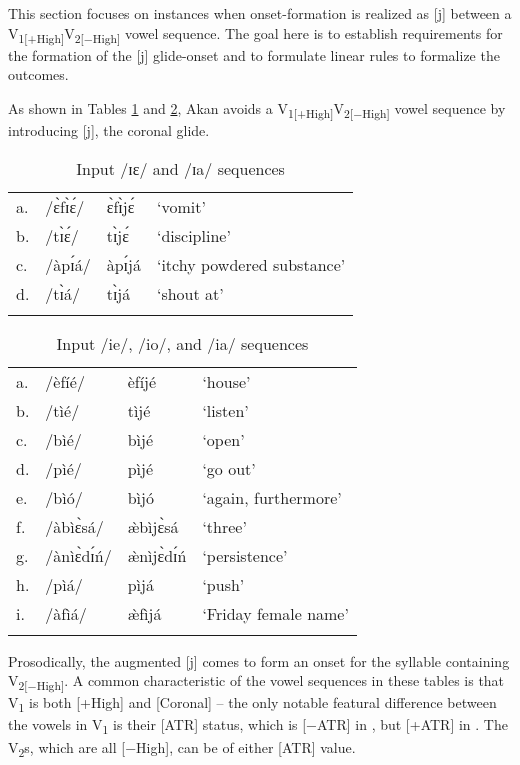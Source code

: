 \documentclass[output=paper,colorlinks,citecolor=brown]{langscibook}
\begin{document}
This section focuses on instances when onset-formation is realized as [j] between a V\textsubscript{1[+High]}V\textsubscript{2[−High]} vowel sequence. The goal here is to establish requirements for the formation of the [j] glide-onset and to formulate linear rules to formalize the outcomes.

As shown in Tables \ref{tab:Tableie_ia} and \ref{tab:Tableie_io}, Akan avoids a V\textsubscript{1[+High]}V\textsubscript{2[−High]} vowel sequence by introducing [j], the coronal glide. 

\begin{table}
\caption{Input /ɪɛ/ and /ɪa/ sequences}
\label{tab:Tableie_ia}
 \begin{tabular}{llll}
  \lsptoprule
a.	&/ɛ̀fɪ̀ɛ́/ 	&ɛ̀fɪ̀jɛ́	&‘vomit’\\
b.	&/tɪ̀ɛ́/	&tɪ̀jɛ́&	‘discipline’\\
c.	&/àpɪ́á/	&àpɪ́já	&‘itchy powdered substance’\\
d.&	/tɪ̀á/ &	tɪ̀já&	‘shout at’\\
  \lspbottomrule
 \end{tabular}
\end{table}   

\begin{table}
\caption{Input /ie/, /io/, and /ia/ sequences}
\label{tab:Tableie_io}
 \begin{tabular}{llll}
  \lsptoprule
a.& 	/èfíé/&	èfíjé	&‘house’\\
b.&	/tìé/ &	tìjé	&‘listen’\\
c.	&/bìé/&	bìjé&	‘open’\\
d.&	/pìé/&	pìjé	&‘go out’\\
e.	&/bìó/	&bìjó	&‘again, furthermore’\\
f.	&/àbìɛ̀sá/&	æ̀bìjɛ̀sá	&‘three’\\
g.	&/ànìɛ̀dɪ́ń/&	æ̀nìjɛ̀dɪ́ń	&‘persistence’ \\
h.&	/pìá/&	pìjá	&‘push’\\
i.&	/àfìá/&æ̀fìjá	&‘Friday female name’\\

  \lspbottomrule
 \end{tabular}
\end{table}   

Prosodically, the augmented [j] comes to form an onset for the syllable containing V\textsubscript{2[−High]}. A common characteristic of the vowel sequences in these tables is that V\textsubscript{1} is both [+High] and [Coronal] – the only notable featural difference between the vowels in V\textsubscript{1} is their [ATR] status, which is  [−ATR] in , but [+ATR] in . The V\textsubscript{2}s, which are all [−High], can be of either [ATR] value.
\end{document}

